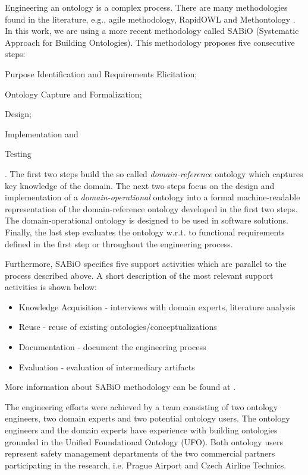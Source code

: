\documentclass[sw]{iosart2x}
\newcommand{\sabio}[0]{SABiO}
\begin{document}
Engineering an ontology is a complex process. There are many methodologies found in the literature, e.g., agile methodology, RapidOWL \cite{Auer2006} and Methontology \cite{Fernandez-Lopez1997}. In this work, we are using a more recent methodology called \sabio{} (Systematic Approach for Building Ontologies). This methodology proposes five consecutive steps: \begin{enumerate*}
    \item Purpose Identification and Requirements Elicitation; 
    \item Ontology Capture and Formalization; 
    \item Design; 
    \item Implementation and 
    \item Testing 
\end{enumerate*}. The first two steps build the so called \emph{domain-reference} ontology which captures key knowledge of the domain. The next two steps focus on the design and implementation of a \emph{domain-operational} ontology into a formal machine-readable representation of the domain-reference ontology developed in the first two steps. The domain-operational ontology is designed to be used in software solutions. Finally, the last step evaluates the ontology w.r.t. to functional requirements defined in the first step or throughout the engineering process. 

Furthermore, \sabio{} specifies five support activities which are parallel to the process described above. A short description of the most relevant support activities is shown below:
\begin{itemize}
\item Knowledge Acquisition - interviews with domain experts, literature analysis
\item Reuse - reuse of existing ontologies/conceptualizations
\item Documentation - document the engineering process
\item Evaluation - evaluation of intermediary artifacts
\end{itemize}
More information about \sabio{} methodology can be found at \cite{DeAlmeidaFalbo2014}.

The engineering efforts were achieved by a team consisting of two ontology engineers, two domain experts and two potential ontology users. The ontology engineers and the domain experts have experience \cite{Kremen2017a,Kostov2017b} with building ontologies grounded in the Unified Foundational Ontology (UFO). Both ontology users represent safety management departments of the two commercial partners participating in the research, i.e. Prague Airport and Czech Airline Technics. 
\end{document}
